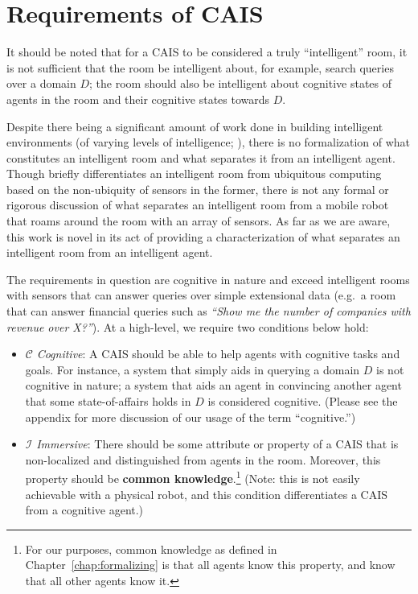 \section{Requirements of CAIS}\label{ref:requirements_cais}

It should be noted that for a CAIS to be considered a truly
``intelligent'' room, it is not sufficient that the room be
intelligent about, for example, search queries over a domain $D$; the
room should also be intelligent about cognitive states of agents in
the room and their cognitive states towards $D$.

Despite there being a significant amount of work done in building
intelligent environments (of varying levels of intelligence;
\cite{coen_design_1998,brooks_intelligent_1997,chan_review_2008}),
there is no formalization of what constitutes an intelligent room and
what separates it from an intelligent agent.  Though
\cite{coen_design_1998} briefly differentiates an intelligent room
from ubiquitous computing based on the non-ubiquity of sensors in the
former, there is not any formal or rigorous discussion of what
separates an intelligent room from a mobile robot that roams around
the room with an array of sensors. As far as we are aware, this work
is novel in its act of providing a characterization of what separates
an intelligent room from an intelligent agent.

The requirements in question are cognitive in nature and exceed
intelligent rooms with sensors that can answer queries over simple
extensional data (e.g.\ a room that can answer financial queries such
as \textit{``Show me the number of companies with revenue over X?''}).
At a high-level, we require two conditions below hold:

\begin{itemize}
    \item $\mathcal{C}$ \emph{Cognitive}: A CAIS should be able to
      help agents with cognitive tasks and goals.  For instance, a
      system that simply aids in querying a domain $D$ is not
      cognitive in nature; a system that aids an agent in convincing
      another agent that some state-of-affairs holds in $D$ is
      considered cognitive. (Please see the appendix for more
      discussion of our usage of the term ``cognitive.'')
    \item $\mathcal{I}$ \emph{Immersive}: There should be some
      attribute or property of a CAIS that is non-localized and
      distinguished from agents in the room.  Moreover, this property
      should be \textbf{common knowledge}.\footnote{For our purposes,
        common knowledge as defined in Chapter~\ref{chap:formalizing}
        is that all agents know this property, and know that all other
        agents know it.}  (Note: this is not easily achievable with a
      physical robot, and this condition differentiates a CAIS from a
      cognitive agent.)
\end{itemize}


